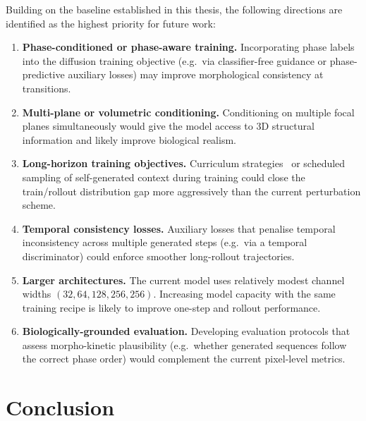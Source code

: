 \documentclass[12pt, a4paper, twoside]{report}
\begin{document}
Building on the baseline established in this thesis, the following directions
are identified as the highest priority for future work:

\begin{enumerate}
  \item \textbf{Phase-conditioned or phase-aware training.}
        Incorporating phase labels into the diffusion training objective
        (e.g.\ via classifier-free guidance or phase-predictive auxiliary
        losses) may improve morphological consistency at transitions.

  \item \textbf{Multi-plane or volumetric conditioning.}
        Conditioning on multiple focal planes simultaneously would give the
        model access to 3D structural information and likely improve biological
        realism.

  \item \textbf{Long-horizon training objectives.}
        Curriculum strategies~\cite{bengio2009curriculum} or scheduled sampling
        of self-generated context during training could close the
        train/rollout distribution gap more aggressively than the current
        perturbation scheme.

  \item \textbf{Temporal consistency losses.}
        Auxiliary losses that penalise temporal inconsistency across multiple
        generated steps (e.g.\ via a temporal discriminator) could enforce
        smoother long-rollout trajectories.

  \item \textbf{Larger architectures.}
        The current model uses relatively modest channel widths
        $(32, 64, 128, 256, 256)$.
        Increasing model capacity with the same training recipe is likely to
        improve one-step and rollout performance.

  \item \textbf{Biologically-grounded evaluation.}
        Developing evaluation protocols that assess morpho-kinetic plausibility
        (e.g.\ whether generated sequences follow the correct phase order) would
        complement the current pixel-level metrics.
\end{enumerate}

\chapter{Conclusion}
\label{chap:conclusion}
\end{document}
